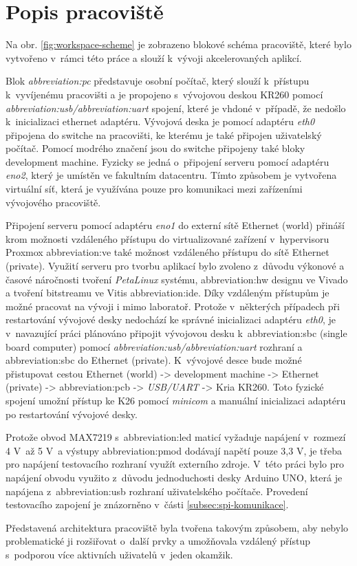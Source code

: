 \documentclass[a4paper, twoside, 11pt]{article}
\begin{document}
\section{Popis pracoviště}\label{sec:popis-pracoviste}
	Na obr. \ref{fig:workspace-scheme} je zobrazeno blokové schéma pracoviště, které bylo vytvořeno v~rámci této práce a slouží k~vývoji akcelerovaných aplikcí.\par
	Blok \textit{\gls{abbreviation:pc}} představuje osobní počítač, který slouží k~přístupu k~vyvíjenému pracovišti a je propojeno s~vývojovou deskou KR260 pomocí \textit{\gls{abbreviation:usb}/\gls{abbreviation:uart}} spojení, které je vhdoné v~případě, že nedošlo k~inicializaci ethernet adaptéru. Vývojová deska je pomocí adaptéru \textit{eth0} připojena do switche na pracovišti, ke kterému je také připojen uživatelský počítač. Pomocí \textcolor{ctublue}{modrého značení} jsou do switche připojeny také bloky \textcolor{ctuorange}{development machine}. Fyzicky se jedná o~připojení serveru pomocí adaptéru \textit{eno2}, který je umístěn ve fakultním datacentru. Tímto způsobem je vytvořena virtuální síť, která je využívána pouze pro komunikaci mezi zařízeními vývojového pracoviště.\par
	Připojení serveru pomocí adaptéru \textit{eno1} do externí sítě \textcolor{ctugreenyblue}{Ethernet (world)} přináší krom možnosti vzdáleného přístupu do virtualizované zařízení v~hypervisoru Proxmox \gls{abbreviation:ve} také možnost vzdáleného přístupu do sítě \textcolor{ctublue}{Ethernet (private)}. Využití serveru pro tvorbu aplikací bylo zvoleno z~důvodu výkonové a časové náročnosti tvoření \textit{PetaLinux} systému, \gls{abbreviation:hw} designu ve Vivado a tvoření bitstreamu ve Vitis \gls{abbreviation:ide}. Díky vzdáleným přístupům je možné pracovat na vývoji i mimo laboratoř. Protože v~některých případech při restartování vývojové desky nedochází ke správné inicializaci adaptéru \textit{eth0}, je v~navazující práci plánováno připojit vývojovou desku k~\gls{abbreviation:sbc} (single board computer) pomocí \textit{\gls{abbreviation:usb}/\gls{abbreviation:uart}} rozhraní a \gls{abbreviation:sbc} do \textcolor{ctublue}{Ethernet (private)}. K~vývojové desce bude možné přistupovat cestou \textcolor{ctugreenyblue}{Ethernet (world)} -> \textcolor{ctuorange}{development machine} -> \textcolor{ctublue}{Ethernet (private)} -> \gls{abbreviation:pcb} -> \textit{USB/UART} -> Kria KR260. Toto fyzické spojení umožní přístup ke K26 pomocí \textit{minicom} a manuální inicializaci adaptéru po restartování vývojové desky.\par
	Protože obvod MAX7219 s~\gls{abbreviation:led} maticí vyžaduje napájení v~rozmezí 4 V~až 5 V~a výstupy \gls{abbreviation:pmod} dodávají napětí pouze 3,3 V, je třeba pro napájení testovacího rozhraní využít externího zdroje. V~této práci bylo pro napájení obvodu využito z~důvodu jednoduchosti desky Arduino UNO, která je napájena z~\gls{abbreviation:usb} rozhraní uživatelského počítače. Provedení testovacího zapojení je znázorněno v~části \ref{subsec:spi-komunikace}.\par
	Představená architektura pracoviště byla tvořena takovým způsobem, aby nebylo problematické ji rozšiřovat o~další prvky a umožňovala vzdálený přístup s~podporou více aktivních uživatelů v~jeden okamžik.
\end{document}
